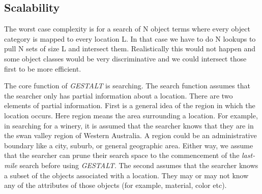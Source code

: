 

\subsection{Scalability}

The worst case complexity is for a search of N object terms where every object category is mapped to every location L. In that case we have to do N lookups to pull N sets of size L and intersect them. Realistically this would not happen and some object classes would be very discriminative and we could intersect those first to be more efficient.



The core function of \textit{GESTALT} is searching. The search function assumes that the searcher only has partial information about a location. 
There are two elements of partial information. First is a general idea of the region in which the location occurs. Here region means the area surrounding a location. 
For example, in searching for a winery, it is assumed that the searcher knows that they are in the swan valley region of Western Australia. A region could be an administrative boundary like a city, suburb, or general geographic area. 
Either way, we assume that the searcher can prune their search space to the commencement of the \textit{last-mile} search before using \textit{GESTALT}.
The second assumes that the searcher knows a subset of the objects associated with a location. They may or may not know any of the attributes of those objects (for example, material, color etc). 


